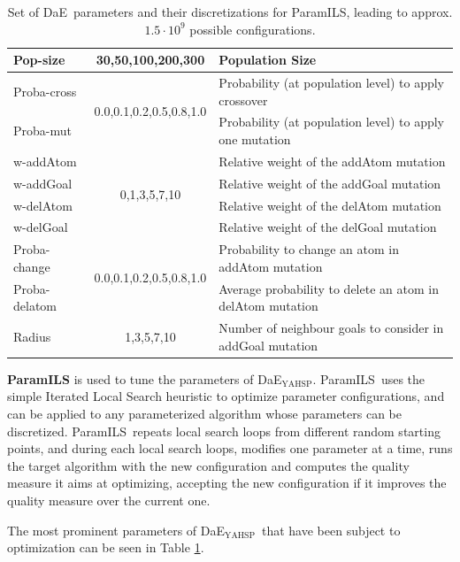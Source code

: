 \documentclass{llncs}
\def\DAE{{\sc DaE}}
\newcommand{\DAEYAHSP}{{\sc DaE$_{\text{YAHSP}}$}}
\def\PARAMILS{{\sc ParamILS}}
\renewcommand{\paragraph}[1]{{\bf #1}}
\begin{document}
\begin{table}[tb!]
\begin{tabular}{|l|c|l|}
\hline
Pop-size 	&	 30,50,100,200,300  	&	 Population Size\\
\hline
Proba-cross	&	 \multirow{2}{*}{0.0,0.1,0.2,0.5,0.8,1.0}  &	 Probability (at population level) to apply crossover\\	
Proba-mut	&	  &	  Probability (at population level) to apply one mutation\\	
\hline
w-addAtom	&	 \multirow{4}{*}{0,1,3,5,7,10}  &	  Relative weight of the addAtom mutation\\					
w-addGoal	&	  &	  Relative weight of the addGoal mutation\\					
w-delAtom	&	  &	 Relative weight of the delAtom mutation\\					
w-delGoal	&	    &	 Relative weight of the delGoal mutation\\												
\hline
Proba-change	&	 \multirow{2}{*}{0.0,0.1,0.2,0.5,0.8,1.0}  &	  Probability to change an atom in addAtom mutation\\							
Proba-delatom	&	  &	 Average probability to delete an atom in delAtom mutation\\
\hline									
Radius	&		 1,3,5,7,10  &	  Number of neighbour goals to consider in addGoal mutation\\		
\hline				
\end{tabular}
\caption{Set of \DAE\ parameters and their discretizations for \PARAMILS, leading to approx. $1.5 \cdot 10^{9}$ possible configurations.}
\label{tab:parameters}
\end{table}

\noindent
\paragraph{{\sc \bf ParamILS}} \cite{hutter2009paramils} is used to tune the parameters of \DAEYAHSP. \PARAMILS\  uses the simple Iterated Local Search heuristic \cite{Lourencco2003} to optimize parameter configurations, and can be applied to any parameterized algorithm whose parameters can be discretized. \PARAMILS\ repeats local search loops from different random starting points, and during each local search loops, modifies one parameter at a time, runs the target algorithm with the new configuration and computes the quality measure it aims at optimizing, accepting the new configuration if it improves the quality measure over the current one.

The most prominent parameters of \DAEYAHSP\ that have been subject to optimization can be seen in Table \ref{tab:parameters}.%
\end{document}
